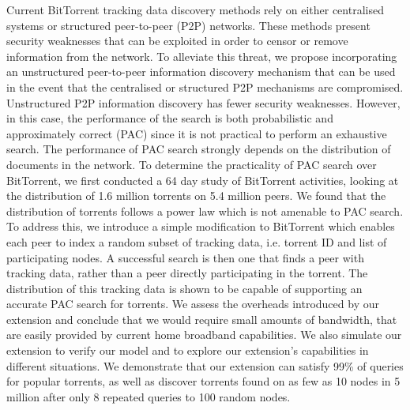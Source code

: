 Current BitTorrent tracking data discovery methods rely on either centralised systems or structured peer-to-peer (P2P) networks. These methods present security weaknesses that can be exploited in order to censor or remove information from the network. To alleviate this threat, we propose incorporating an unstructured peer-to-peer information discovery mechanism that can be used in the event that the centralised or structured P2P mechanisms are compromised. Unstructured P2P information discovery has fewer security weaknesses. However, in this case, the performance of the search is both probabilistic and approximately correct (PAC) since it is not practical to perform an exhaustive search. The performance of PAC search strongly depends on the distribution of documents in the network. To determine the practicality of PAC search over BitTorrent, we first conducted a 64 day study of BitTorrent activities, looking at the distribution of 1.6 million torrents on 5.4 million peers. We found that the distribution of torrents follows a power law which is not amenable to PAC search. To address this, we introduce a simple modification to BitTorrent which enables each peer to index a random subset of tracking data, i.e. torrent ID and list of participating nodes. A successful search is then one that finds a peer with tracking data, rather than a peer directly participating in the torrent. The distribution of this tracking data is shown to be capable of supporting an accurate PAC search for torrents. We assess the overheads introduced by our extension and conclude that we would require small amounts of bandwidth, that are easily provided by current home broadband capabilities. We also simulate our extension to verify our model and to explore our extension's capabilities in different situations. We demonstrate that our extension can satisfy 99\% of queries for popular torrents, as well as discover torrents found on as few as 10 nodes in 5 million after only 8 repeated queries to 100 random nodes.
